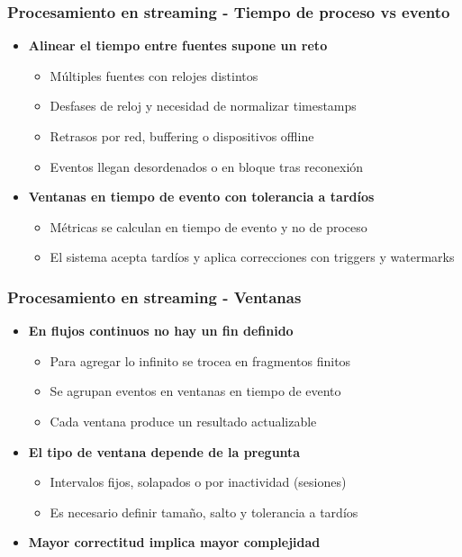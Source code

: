 \documentclass[aspectratio=169]{beamer}
\begin{document}
\begin{frame}
\frametitle{Procesamiento en streaming - Tiempo de proceso vs evento}
\begin{itemize}

  \item \textbf{Alinear el tiempo entre fuentes supone un reto}
  \begin{itemize}
    \item Múltiples fuentes con relojes distintos
    \item Desfases de reloj y necesidad de normalizar timestamps
    \item Retrasos por red, buffering o dispositivos offline
    \item Eventos llegan desordenados o en bloque tras reconexión
  \end{itemize}

  \vspace{1em}

  \item \textbf{Ventanas en tiempo de evento con tolerancia a tardíos}
  \begin{itemize}
    \item Métricas se calculan en tiempo de evento y no de proceso
    \item El sistema acepta tardíos y aplica correcciones con triggers y watermarks
  \end{itemize}
\end{itemize}
\end{frame}



\begin{frame}
\frametitle{Procesamiento en streaming - Ventanas}
\begin{itemize}
  \item \textbf{En flujos continuos no hay un fin definido}
  \begin{itemize}
    \item Para agregar lo infinito se trocea en fragmentos finitos
    \item Se agrupan eventos en ventanas en tiempo de evento
    \item Cada ventana produce un resultado actualizable
  \end{itemize}

  \vspace{1em}

  \item \textbf{El tipo de ventana depende de la pregunta}
  \begin{itemize}
    \item Intervalos fijos, solapados o por inactividad (sesiones)
    \item Es necesario definir tamaño, salto y tolerancia a tardíos
  \end{itemize}
  
  \vspace{1em}
    
  \item \textbf{Mayor correctitud implica mayor complejidad}
\end{itemize}
\end{frame}
\end{document}
